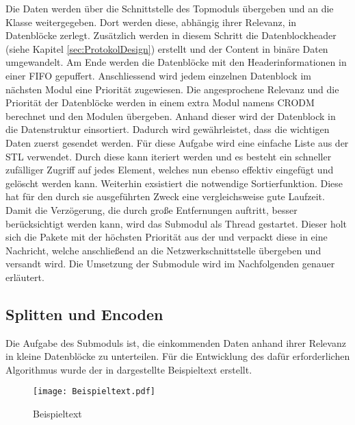 Die Daten werden {\"u}ber die Schnittstelle des Topmoduls {\"u}bergeben und an die
Klasse  weitergegeben. Dort werden diese, abh{\"a}ngig
ihrer Relevanz, in Datenbl{\"o}cke zerlegt. Zus{\"a}tzlich werden in diesem
Schritt die Datenblockheader (siehe Kapitel \ref{sec:ProtokolDesign}) erstellt und der
Content in bin{\"a}re Daten umgewandelt. Am Ende werden die Datenbl{\"o}cke mit den
Headerinformationen in einer \gls{FIFO} gepuffert.
Anschliessend wird jedem einzelnen Datenblock im n{\"a}chsten Modul eine Priorit{\"a}t zugewiesen. Die angesprochene
Relevanz und die Priorit{\"a}t der Datenbl{\"o}cke werden in einem extra Modul namens
\gls{CRODM} berechnet und den Modulen {\"u}bergeben.
Anhand dieser wird der Datenblock in die Datenstruktur
 einsortiert. Dadurch wird
gew{\"a}hrleistet, dass die wichtigen Daten zuerst gesendet werden. F{\"u}r diese
Aufgabe wird eine einfache Liste aus der \gls{STL} verwendet. Durch diese kann
iteriert werden und es besteht ein schneller zufälliger Zugriff auf jedes
Element, welches nun ebenso effektiv eingefügt und gelöscht werden kann.
Weiterhin exsistiert die notwendige Sortierfunktion. Diese hat f{\"u}r den durch sie
ausgef{\"u}hrten Zweck eine vergleichsweise gute Laufzeit.
Damit die Verz{\"o}gerung, die durch gro{\ss}e Entfernungen auftritt, besser
ber{\"u}cksichtigt werden kann, wird das Submodul  als Thread
gestartet.
Dieser holt sich die Pakete mit der h{\"o}chsten Priorit{\"a}t aus der
 und verpackt diese in eine Nachricht, welche
anschlie{\ss}end an die Netzwerkschnittstelle {\"u}bergeben und versandt wird.
\newline Die Umsetzung der Submodule wird im Nachfolgenden genauer
erl{\"a}utert.

\subsection{Splitten und Encoden}

Die Aufgabe des Submoduls  ist, die einkommenden Daten
anhand ihrer Relevanz in kleine Datenbl{\"o}cke zu unterteilen. F{\"u}r die Entwicklung
des daf{\"u}r erforderlichen Algorithmus wurde der in 
dargestellte Beispieltext erstellt.

\begin{figure}[H]
	\centering
	\texttt{[image: Beispieltext.pdf]}
	\caption{Beispieltext}
	\label{fig:Beispieltext}
\end{figure}

